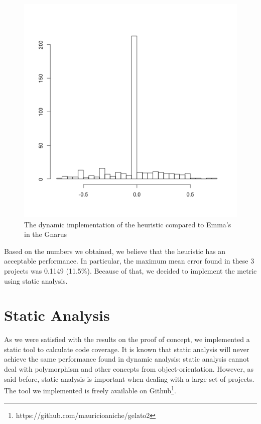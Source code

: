 \documentclass{sig-alternate}
\begin{document}
\begin{figure}[h!H]
  \centering
  \includegraphics[scale=0.4]{../stats/gnarus-histograma-aspectj.png}
  \caption{The dynamic implementation of the heuristic compared to Emma's in the Gnarus}
  \label{fig:gnarus-aj}
\end{figure}

Based on the numbers we obtained, we believe that the heuristic has an acceptable performance. 
In particular, the maximum mean error found in these 3 projects was 0.1149 (11.5\%). Because of that,
we decided to implement the metric using static analysis. 

\section{Static Analysis}
\label{sec-results}

As we were satisfied with the results on the proof of concept, we implemented a static tool
to calculate code coverage. It is known that static analysis will never achieve the same performance
found in dynamic analysis: static analysis cannot deal with polymorphism and other concepts from object-orientation.
However, as said before, static analysis is important when dealing with a large set of projects.
The tool we implemented is freely available on Github\footnote{https://github.com/mauricioaniche/gelato2}.
\end{document}
